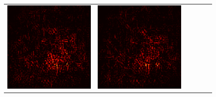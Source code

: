 \documentclass[preprint,12pt]{elsarticle}
\begin{document}
\begin{figure}[p]
\begin{tabular}{cccccc}
  \includegraphics[scale=\scale]{../visualizations/examples/imagenette/resnet18/active_saliency_map/1.png} & 
  \includegraphics[scale=\scale]{../visualizations/examples/imagenette/resnet18/inactive_saliency_map/1.png} \\
  

\end{tabular}
\end{figure}
\end{document}
